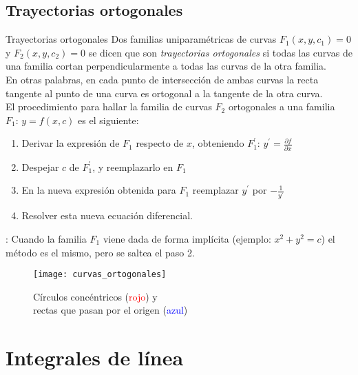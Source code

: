 \documentclass[a4paper, twoside]{article}
\numberwithin{equation}{section}
\numberwithin{figure}{section}
\numberwithin{table}{section}
\begin{document}
\subsection{Trayectorias ortogonales}
\begin{minipage}{0.6\textwidth}
	\begin{definicion*}{Trayectorias ortogonales}
		Dos familias uniparamétricas de curvas $F_1(x,y,c_1)=0$ y $F_2(x,y,c_2)=0$ se dicen que son \emph{trayectorias ortogonales} si todas las curvas de una familia cortan perpendicularmente a todas las curvas de la otra familia.\\
		
		En otras palabras, en cada punto de intersección de ambas curvas la recta tangente al punto de una curva es ortogonal a la tangente de la otra curva.\\
		
		El procedimiento para hallar la familia de curvas $F_2$ ortogonales a una familia $F_1:\, y=f(x,c)$ es el siguiente:
		\begin{enumerate}
			\item Derivar la expresión de $F_1$ respecto de $x$, obteniendo $F_1^\prime:\, y^\prime=\frac{\partial f}{\partial x}$
			\item Despejar $c$ de $F_1^\prime$, y reemplazarlo en $F_1$
			\item En la nueva expresión obtenida para $F_1$ reemplazar $y^\prime$ por $-\frac{1}{y^\prime}$
			\item Resolver esta nueva ecuación diferencial.
		\end{enumerate}
		
		: {\footnotesize Cuando la familia $F_1$ viene dada de forma implícita (ejemplo: $x^2+y^2=c$) el método es el mismo, pero se saltea el paso 2.}
	\end{definicion*}
\end{minipage}
\begin{minipage}{0.4\textwidth}
	\begin{figure}[H]
		\centering
		\texttt{[image: curvas\_ortogonales]}
		\caption{{\scriptsize Círculos concéntricos (\textcolor{red}{rojo}) y \\ rectas que pasan por el origen (\textcolor{blue}{azul})}}
	\end{figure}
\end{minipage}

\newpage
\section{Integrales de línea}
\end{document}
